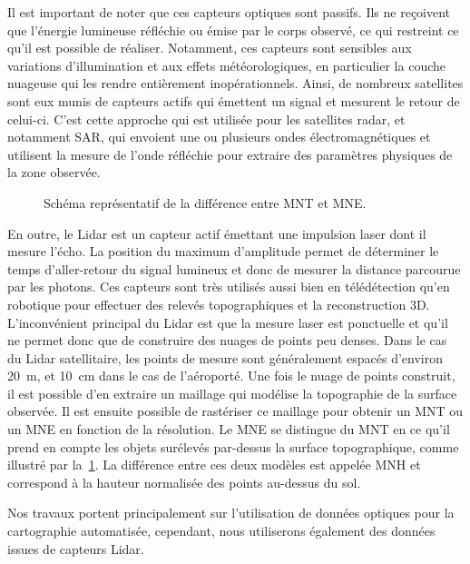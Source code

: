 Il est important de noter que ces capteurs optiques sont passifs. Ils ne reçoivent que l'énergie lumineuse réfléchie ou émise par le corps observé, ce qui restreint ce qu'il est possible de réaliser. Notamment, ces capteurs sont sensibles aux variations d'illumination et aux effets météorologiques, en particulier la couche nuageuse qui les rendre entièrement inopérationnels. Ainsi, de nombreux satellites sont eux munis de capteurs actifs qui émettent un signal et mesurent le retour de celui-ci. C'est cette approche qui est utilisée pour les satellites radar, et notamment \gls{SAR}, qui envoient une ou plusieurs ondes électromagnétiques et utilisent la mesure de l'onde réfléchie pour extraire des paramètres physiques de la zone observée.

\begin{figure}
  \resizebox{\textwidth}{!}{
  
  }
  \caption{Schéma représentatif de la différence entre \gls{MNT} et \gls{MNE}.}
  \label{fig:mnt}
\end{figure}

En outre, le \gls{Lidar} est un capteur actif émettant une impulsion laser dont il mesure l'écho. La position du maximum d'amplitude permet de déterminer le temps d'aller-retour du signal lumineux et donc de mesurer la distance parcourue par les photons. Ces capteurs sont très utilisés aussi bien en télédétection qu'en robotique pour effectuer des relevés topographiques et la reconstruction 3D. L'inconvénient principal du \gls{Lidar} est que la mesure laser est ponctuelle et qu'il ne permet donc que de construire des nuages de points peu denses. Dans le cas du \gls{Lidar} satellitaire, les points de mesure sont généralement espacés d'environ \SI{20}{\meter}, et \SI{10}{\centi\meter} dans le cas de l'aéroporté. Une fois le nuage de points construit, il est possible d'en extraire un maillage qui modélise la topographie de la surface observée. Il est ensuite possible de rastériser ce maillage pour obtenir un \gls{MNT} ou un \gls{MNE} en fonction de la résolution. Le \gls{MNE} se distingue du \gls{MNT} en ce qu'il prend en compte les objets surélevés par-dessus la surface topographique, comme illustré par la~\cref{fig:mnt}. La différence entre ces deux modèles est appelée \gls{MNH} et correspond à la hauteur normalisée des points au-dessus du sol.

Nos travaux portent principalement sur l'utilisation de données optiques pour la cartographie automatisée, cependant, nous utiliserons également des données issues de capteurs \gls{Lidar}.

